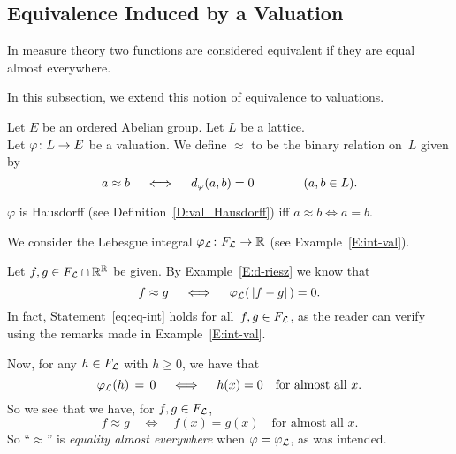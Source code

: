 \documentclass[main.tex]{subfiles}
\begin{document}
\subsection{Equivalence Induced by a Valuation}
\label{SS:vals_eq}
In measure theory
two functions are considered equivalent
if they are equal almost everywhere.

In this subsection, we extend this notion of equivalence 
to valuations. 
%
%
\begin{dfn}
\label{D:eq}
\label{D:approx}
Let $E$ be an ordered Abelian group.
Let $L$ be a lattice.\\
Let $\varphi\colon L\rightarrow E$ be a valuation.
We define $\approx$ to be 
the binary relation on~$L$ given by
\begin{equation*}
a \approx b
\quad\iff\quad
d_{\smash{\varphi}}(a,b)=0\qquad\qquad(a,b\in L).
\end{equation*}
\end{dfn}
\begin{rem}
$\varphi$ is Hausdorff (see Definition~\ref{D:val_Hausdorff})
iff $a \approx b\iff a = b$.
\end{rem}
%
%
\begin{ex}
\label{E:eq-int}
We consider the Lebesgue integral $\varphi_{\mathcal{L}}\colon F_{\mathcal{L}}\rightarrow \mathbb{R}$
(see Example~\ref{E:int-val}).

Let $f,g\in F_{\mathcal{L}}\cap \mathbb{R}^{\mathbb{R}}$ be given.
By Example~\ref{E:d-riesz} 
we know that
\begin{equation}
\label{eq:eq-int}
f\approx g\quad\iff\quad \varphi_{\mathcal{L}}(\,|f-g|\,)=0.
\end{equation}
In fact,
Statement~\eqref{eq:eq-int}
holds for all~$f,g\in F_{\mathcal{L}}$,
as the reader can verify using the remarks
made in Example~\ref{E:int-val}.

Now, for any $h\in F_{\mathcal{L}}$
with $h\geq 0$,
we have that
\begin{equation*}
\varphi_{\mathcal{L}}(h)\,=\,0
\quad\iff\quad \text{$h(x)=0$\quad for almost all~$x$.}
\end{equation*}
So we see that
we have, for $f,g\in F_{\mathcal{L}}$,
\begin{equation*}
f\approx g\quad\iff\quad f(x) = g(x)\quad\text{for almost all~$x$}.
\end{equation*}
So ``$\approx$''
is \emph{equality almost everywhere}
when $\varphi=\varphi_{\mathcal{L}}$,
as was intended.
\end{ex}
%
%
\end{document}
